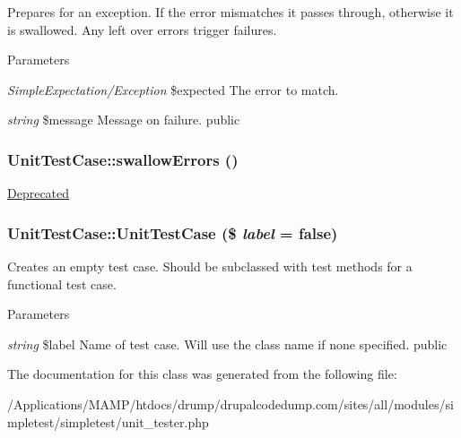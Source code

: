 \label{class_unit_test_case_a7653373ecf57e9badb0de44097a76fe3}
Prepares for an exception. If the error mismatches it passes through, otherwise it is swallowed. Any left over errors trigger failures. 
\begin{DoxyParams}{Parameters}
\item[{\em SimpleExpectation/Exception}]\$expected The error to match. \item[{\em string}]\$message Message on failure.  public \end{DoxyParams}
\hypertarget{class_unit_test_case_ac3764e45c5824f0ce866efef48b39752}{
\subsubsection[{swallowErrors}]{\setlength{\rightskip}{0pt plus 5cm}UnitTestCase::swallowErrors ()}}
\label{class_unit_test_case_ac3764e45c5824f0ce866efef48b39752}
\begin{Desc}
\item[\hyperlink{deprecated__deprecated000020}{Deprecated}]\end{Desc}
\hypertarget{class_unit_test_case_affc46b2886ff25f1d99af2aaed64a963}{
\subsubsection[{UnitTestCase}]{\setlength{\rightskip}{0pt plus 5cm}UnitTestCase::UnitTestCase (\$ {\em label} = {\ttfamily false})}}
\label{class_unit_test_case_affc46b2886ff25f1d99af2aaed64a963}
Creates an empty test case. Should be subclassed with test methods for a functional test case. 
\begin{DoxyParams}{Parameters}
\item[{\em string}]\$label Name of test case. Will use the class name if none specified.  public \end{DoxyParams}


The documentation for this class was generated from the following file:\begin{DoxyCompactItemize}
\item 
/Applications/MAMP/htdocs/drump/drupalcodedump.com/sites/all/modules/simpletest/simpletest/unit\_\-tester.php\end{DoxyCompactItemize}
